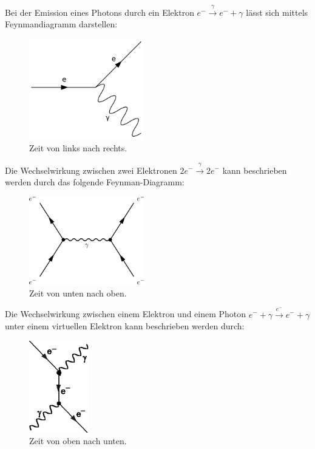 \documentclass{subfiles}
\begin{document}
    \subaufgabe{}
        Bei der Emission eines Photons durch ein Elektron $e^{-}\stackrel{\gamma}{\longrightarrow}e^-+\gamma$ lässt sich mittels Feynmandiagramm darstellen:
        
        \begin{figure}[H]
            \centering
            \includegraphics[width=5cm]{../Bilddateien/Feynman-electron-photon-emission.svg.png}
            \caption{Zeit von links nach rechts.}
        \end{figure}

    \subaufgabe{}
        Die Wechselwirkung zwischen zwei Elektronen $2e^{-}\stackrel{\gamma}{\longrightarrow}2e^-$ kann beschrieben werden durch das folgende Feynman-Diagramm:
        \begin{figure}[H]
            \centering
            \includegraphics[width=5cm]{../Bilddateien/Feynmandiagramm.png}
            \caption{Zeit von unten nach oben.}
        \end{figure}


    \subaufgabe{}
        Die Wechselwirkung zwischen einem Elektron und einem Photon $e^{-}+\gamma\stackrel{e^-}{\longrightarrow}e^-+\gamma$ unter einem virtuellen Elektron kann beschrieben werden durch:
        \begin{figure}[H]
            \centering
            \includegraphics[height=4cm]{../Bilddateien/feyn_comp.png}
            \caption{Zeit von oben nach unten.}
        \end{figure}
\end{document}
